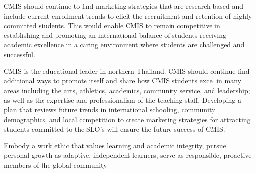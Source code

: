 
CMIS should continue to find marketing strategies that are research based and include current enrollment trends to elicit the recruitment and retention of highly committed students. This would enable CMIS to remain competitive in establishing and promoting an international balance of students receiving academic excellence in a caring environment where students are challenged and successful. 


CMIS is the educational leader in northern Thailand. CMIS should continue find additional ways to promote itself and share how CMIS students excel in many areas including the arts, athletics, academics, community service, and leadership; as well as the expertise and professionalism of the teaching staff. Developing a plan that reviews future trends in international schooling, community demographics, and local competition to create marketing strategies for attracting  students committed to the SLO’s will ensure the future success of CMIS. 


Embody a work ethic that values learning and academic integrity, pursue personal growth as adaptive, independent learners, serve as responsible, proactive members of the global community

